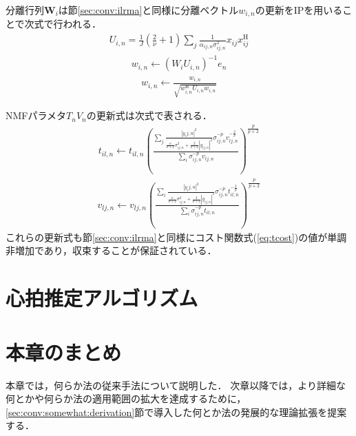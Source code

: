 分離行列$\bm{W}_{i}$は節\ref{sec:conv:ilrma}と同様に分離ベクトル$w_{i,n}$の更新をIPを用いることで次式で行われる．
\begin{align}
    U_{i,n}=\frac{1}{J}\left(\frac{2}{\nu}+1\right)\sum_{j}\frac{1}{\alpha_{ij,n}\sigma_{ij,n}^{2}}x_{ij}x_{ij}^{\mathrm{H}} \label{eq:tip1}
\end{align}
\begin{align}
    w_{i,n}\leftarrow\left(W_{i}U_{i,n}\right)^{-1}e_{n} \label{eq:tip2}
\end{align}
\begin{align}
    w_{i,n}\leftarrow\frac{w_{i,n}}{\sqrt{w_{i,n}^{\mathrm{H}}U_{i,n}w_{i,n}}} \label{eq:tip3}
\end{align}

NMFパラメタ$T_{n}V_{n}$の更新式は次式で表される．
\begin{align}
    t_{il,n}\leftarrow t_{il,n}\left(\frac{\sum_{j}\frac{|y_ij,n|^{2}}{\frac{\nu}{\nu+2}\sigma_{ij,n}^{2}+\frac{2}{\nu+2}|y_{ij,n}|^{2}}\sigma_{ij,n}^{-p}v_{lj,n}^{-\frac{2}{p}}}{\sum_{i}\sigma_{ij,n}^{-p}v_{lj,n}}\right)^{\frac{p}{p+2}} \label{eq:tt}
\end{align}
\begin{align}
    v_{lj,n}\leftarrow v_{lj,n}\left(\frac{\sum_{i}\frac{|y_ij,n|^{2}}{\frac{\nu}{\nu+2}\sigma_{ij,n}^{2}+\frac{2}{\nu+2}|y_{ij,n}|^{2}}\sigma_{ij,n}^{-p}t_{il,n}^{-\frac{2}{p}}}{\sum_{i}\sigma_{ij,n}^{-p}t_{il,n}}\right)^{\frac{p}{p+2}} \label{eq:tv}
\end{align}
これらの更新式も節\ref{sec:conv:ilrma}と同様にコスト関数式(\ref{eq:tcost})の値が単調非増加であり，収束することが保証されている．


\section{心拍推定アルゴリズム}
\label{sec:conv:heartrateestalgo}

\section{本章のまとめ}
本章では，何らか法の従来手法について説明した．
次章以降では，より詳細な何とかや何らか法の適用範囲の拡大を達成するために，
\ref{sec:conv:somewhat:derivation}節で導入した何とか法の発展的な理論拡張を提案する．



